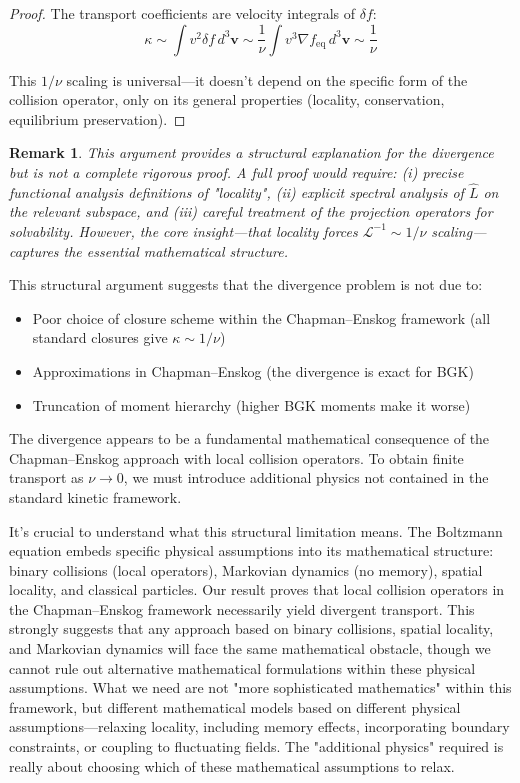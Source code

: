 \documentclass[12pt,a4paper]{article}
\newtheorem{remark}[theorem]{Remark}
\newcommand{\vect}[1]{\mathbf{#1}}
\begin{document}
\begin{proof}
The transport coefficients are velocity integrals of $\delta f$:
\begin{equation}
\kappa \sim \int v^2 \delta f \, d^3\vect{v} \sim \frac{1}{\nu} \int v^3 \nabla f_{\text{eq}} \, d^3\vect{v} \sim \frac{1}{\nu}
\label{eq:transport_scaling}
\end{equation}

This $1/\nu$ scaling is universal—it doesn't depend on the specific form of the collision operator, only on its general properties (locality, conservation, equilibrium preservation).
\end{proof}

\begin{remark}
This argument provides a structural explanation for the divergence but is not a complete rigorous proof. A full proof would require: (i) precise functional analysis definitions of "locality", (ii) explicit spectral analysis of $\hat{L}$ on the relevant subspace, and (iii) careful treatment of the projection operators for solvability. However, the core insight—that locality forces $\mathcal{L}^{-1} \sim 1/\nu$ scaling—captures the essential mathematical structure.
\end{remark}

This structural argument suggests that the divergence problem is not due to:
\begin{itemize}[leftmargin=*]
\item Poor choice of closure scheme within the Chapman--Enskog framework (all standard closures give $\kappa \sim 1/\nu$)
\item Approximations in Chapman--Enskog (the divergence is exact for BGK)
\item Truncation of moment hierarchy (higher BGK moments make it worse)
\end{itemize}

The divergence appears to be a fundamental mathematical consequence of the Chapman--Enskog approach with local collision operators. To obtain finite transport as $\nu \to 0$, we must introduce additional physics not contained in the standard kinetic framework.

It's crucial to understand what this structural limitation means. The Boltzmann equation embeds specific physical assumptions into its mathematical structure: binary collisions (local operators), Markovian dynamics (no memory), spatial locality, and classical particles. Our result proves that local collision operators in the Chapman--Enskog framework necessarily yield divergent transport. This strongly suggests that any approach based on binary collisions, spatial locality, and Markovian dynamics will face the same mathematical obstacle, though we cannot rule out alternative mathematical formulations within these physical assumptions. What we need are not "more sophisticated mathematics" within this framework, but different mathematical models based on different physical assumptions—relaxing locality, including memory effects, incorporating boundary constraints, or coupling to fluctuating fields. The "additional physics" required is really about choosing which of these mathematical assumptions to relax.
\end{document}
